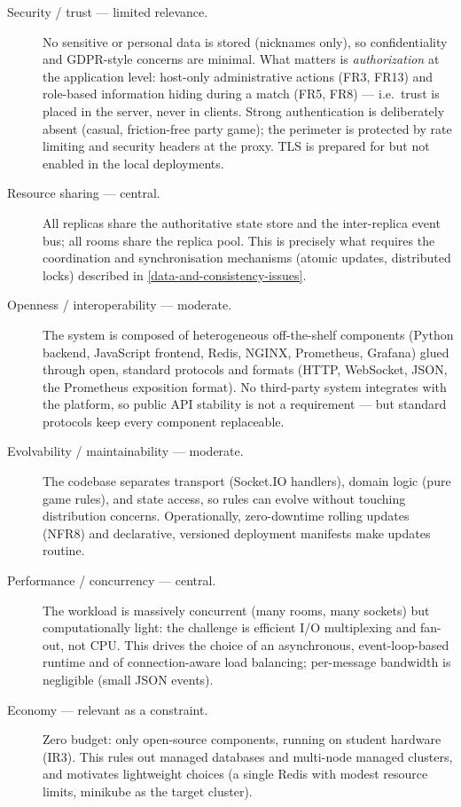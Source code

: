 \documentclass{scrartcl}
\begin{document}
\begin{description}
  \item[Security / trust --- limited relevance.] No sensitive or personal
  data is stored (nicknames only), so confidentiality and GDPR-style
  concerns are minimal. What matters is \emph{authorization} at the
  application level: host-only administrative actions (FR3, FR13) and
  role-based information hiding during a match (FR5, FR8) --- i.e.\ trust is
  placed in the server, never in clients. Strong authentication is
  deliberately absent (casual, friction-free party game); the perimeter is
  protected by rate limiting and security headers at the proxy. TLS is
  prepared for but not enabled in the local deployments.

  \item[Resource sharing --- central.] All replicas share the authoritative
  state store and the inter-replica event bus; all rooms share the replica
  pool. This is precisely what requires the coordination and
  synchronisation mechanisms (atomic updates, distributed locks) described
  in \cref{data-and-consistency-issues}.

  \item[Openness / interoperability --- moderate.] The system is composed of
  heterogeneous off-the-shelf components (Python backend, JavaScript
  frontend, Redis, NGINX, Prometheus, Grafana) glued through open,
  standard protocols and formats (HTTP, WebSocket, JSON, the Prometheus
  exposition format). No third-party system integrates with the platform,
  so public API stability is not a requirement --- but standard protocols
  keep every component replaceable.

  \item[Evolvability / maintainability --- moderate.] The codebase separates
  transport (Socket.IO handlers), domain logic (pure game rules), and
  state access, so rules can evolve without touching distribution
  concerns. Operationally, zero-downtime rolling updates (NFR8) and
  declarative, versioned deployment manifests make updates routine.

  \item[Performance / concurrency --- central.] The workload is massively
  concurrent (many rooms, many sockets) but computationally light: the
  challenge is efficient I/O multiplexing and fan-out, not CPU. This
  drives the choice of an asynchronous, event-loop-based runtime and of
  connection-aware load balancing; per-message bandwidth is negligible
  (small JSON events).

  \item[Economy --- relevant as a constraint.] Zero budget: only
  open-source components, running on student hardware (IR3). This rules
  out managed databases and multi-node managed clusters, and motivates
  lightweight choices (a single Redis with modest resource limits,
  minikube as the target cluster).
\end{description}
\end{document}
